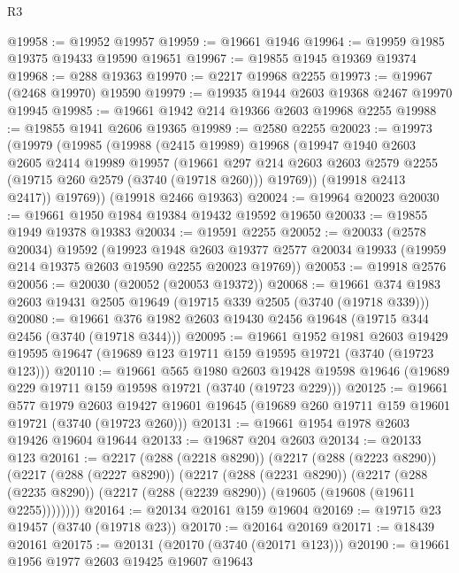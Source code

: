 \begin{lexlean}{R3}
\begin{coremodule}
@19958 := @19952 @19957
@19959 := @19661 @1946
@19964 := @19959 @1985 @19375 @19433 @19590 @19651
@19967 := @19855 @1945 @19369 @19374
@19968 := @288 @19363
@19970 := @2217 @19968 @2255
@19973 := @19967 (@2468 @19970) @19590
@19979 := @19935 @1944 @2603 @19368 @2467 @19970 @19945
@19985 := @19661 @1942 @214 @19366 @2603 @19968 @2255
@19988 := @19855 @1941 @2606 @19365
@19989 := @2580 @2255
@20023 := @19973
    (@19979
      (@19985
        (@19988
          (@2415 @19989)
          @19968
          (@19947
            @1940
            @2603
            @2605
            @2414
            @19989
            @19957
            (@19661
              @297
              @214
              @2603
              @2603
              @2579
              @2255
              (@19715 @260 @2579 (@3740 (@19718 @260)))
              @19769))
          (@19918 @2413 @2417))
        @19769))
    (@19918 @2466 @19363)
@20024 := @19964 @20023
@20030 := @19661 @1950 @1984 @19384 @19432 @19592 @19650
@20033 := @19855 @1949 @19378 @19383
@20034 := @19591 @2255
@20052 := @20033
    (@2578 @20034)
    @19592
    (@19923
      @1948
      @2603
      @19377
      @2577
      @20034
      @19933
      (@19959 @214 @19375 @2603 @19590 @2255 @20023 @19769))
@20053 := @19918 @2576
@20056 := @20030 (@20052 (@20053 @19372))
@20068 := @19661 @374 @1983 @2603 @19431 @2505 @19649 (@19715 @339 @2505 (@3740 (@19718 @339)))
@20080 := @19661 @376 @1982 @2603 @19430 @2456 @19648 (@19715 @344 @2456 (@3740 (@19718 @344)))
@20095 := @19661
    @1952
    @1981
    @2603
    @19429
    @19595
    @19647
    (@19689 @123 @19711 @159 @19595 @19721 (@3740 (@19723 @123)))
@20110 := @19661
    @565
    @1980
    @2603
    @19428
    @19598
    @19646
    (@19689 @229 @19711 @159 @19598 @19721 (@3740 (@19723 @229)))
@20125 := @19661
    @577
    @1979
    @2603
    @19427
    @19601
    @19645
    (@19689 @260 @19711 @159 @19601 @19721 (@3740 (@19723 @260)))
@20131 := @19661 @1954 @1978 @2603 @19426 @19604 @19644
@20133 := @19687 @204 @2603
@20134 := @20133 @123
@20161 := @2217
    (@288 (@2218 @8290))
    (@2217
      (@288 (@2223 @8290))
      (@2217
        (@288 (@2227 @8290))
        (@2217
          (@288 (@2231 @8290))
          (@2217
            (@288 (@2235 @8290))
            (@2217 (@288 (@2239 @8290)) (@19605 (@19608 (@19611 @2255))))))))
@20164 := @20134 @20161 @159 @19604
@20169 := @19715 @23 @19457 (@3740 (@19718 @23))
@20170 := @20164 @20169
@20171 := @18439 @20161
@20175 := @20131 (@20170 (@3740 (@20171 @123)))
@20190 := @19661
    @1956
    @1977
    @2603
    @19425
    @19607
    @19643

\end{coremodule}
\end{lexlean}

